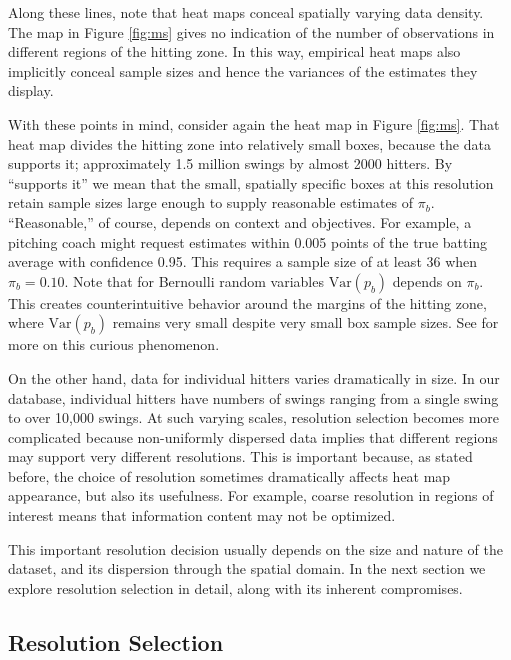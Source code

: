 Along these lines, note that heat maps conceal spatially varying data density. The map in Figure \ref{fig:ms} gives no indication of the number of observations in different regions of the hitting zone. In this way, empirical heat maps also implicitly conceal sample sizes and hence the variances of the estimates they display.  

With these points in mind, consider again the heat map in Figure \ref{fig:ms}. That heat map divides the hitting zone into relatively small boxes, because the data supports it; approximately 1.5 million swings by almost 2000 hitters. By ``supports it'' we mean that the small, spatially specific boxes at this resolution retain sample sizes large enough to supply reasonable estimates of $\pi_{b}$. ``Reasonable,'' of course, depends on context and objectives. For example, a pitching coach might request estimates within 0.005 points of the true batting average with confidence 0.95. This requires a sample size of at least 36 when $\pi_{b} = 0.10$. Note that for Bernoulli random variables $\text{Var}(p_{b})$ depends on $\pi_{b}$. This creates counterintuitive behavior around the margins of the hitting zone, where $\text{Var}(p_{b})$ remains very small despite very small box sample sizes. See \cite{Dixon2005} for more on this curious phenomenon.

On the other hand, data for individual hitters varies dramatically in size. In our database, individual hitters have numbers of swings ranging from a single swing to over 10,000 swings. At such varying scales, resolution selection becomes more complicated because non-uniformly dispersed data implies that different regions may support very different resolutions. This is important because, as stated before, the choice of resolution sometimes dramatically affects heat map appearance, but also its usefulness. For example, coarse resolution in regions of interest means that information content may not be optimized. 

This important resolution decision usually depends on the size and nature of the dataset, and its dispersion through the spatial domain. In the next section we explore resolution selection in detail, along with its inherent compromises.

\subsection{Resolution Selection}

